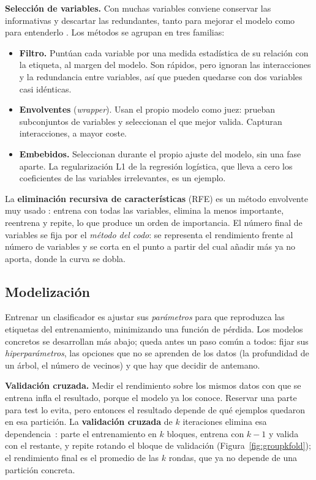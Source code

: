 \documentclass[12pt,a4paper]{report}
\theoremstyle{definition}
\begin{document}
\medskip
\noindent\textbf{Selección de variables.} Con muchas variables conviene conservar las informativas y
descartar las redundantes, tanto para mejorar el modelo como para entenderlo \cite{guyon2003selection}.
Los métodos se agrupan en tres familias:
\begin{itemize}
\item \textbf{Filtro.} Puntúan cada variable por una medida estadística de su relación con la etiqueta,
al margen del modelo. Son rápidos, pero ignoran las interacciones y la redundancia entre variables, así
que pueden quedarse con dos variables casi idénticas.
\item \textbf{Envolventes} (\emph{wrapper}). Usan el propio modelo como juez: prueban subconjuntos de
variables y seleccionan el que mejor valida. Capturan interacciones, a mayor coste.
\item \textbf{Embebidos.} Seleccionan durante el propio ajuste del modelo, sin una fase aparte. La
regularización L1 de la regresión logística, que lleva a cero los coeficientes de las variables
irrelevantes, es un ejemplo.
\end{itemize}
La \textbf{eliminación recursiva de características} (RFE) es un método envolvente muy usado
\cite{guyon2002rfe}: entrena con todas las variables, elimina la menos importante, reentrena y repite,
lo que produce un orden de importancia. El número final de variables se fija por el \emph{método del
codo}: se representa el rendimiento frente al número de variables y se corta en el punto a partir del
cual añadir más ya no aporta, donde la curva se dobla.

\subsection{Modelización}

Entrenar un clasificador es ajustar sus \emph{parámetros} para que reproduzca las etiquetas del
entrenamiento, minimizando una función de pérdida. Los modelos concretos se desarrollan más abajo;
queda antes un paso común a todos: fijar sus \emph{hiperparámetros}, las opciones que no se aprenden de
los datos (la profundidad de un árbol, el número de vecinos) y que hay que decidir de antemano.

\medskip
\noindent\textbf{Validación cruzada.} Medir el rendimiento sobre los mismos datos con que se entrena
infla el resultado, porque el modelo ya los conoce. Reservar una parte para test lo evita, pero
entonces el resultado depende de qué ejemplos quedaron en esa partición. La \textbf{validación cruzada}
de $k$ iteraciones elimina esa dependencia~\cite{stone1974crossval}: parte el entrenamiento en $k$
bloques, entrena con $k-1$ y valida con el restante, y repite rotando el bloque de validación
(Figura~\ref{fig:groupkfold}); el rendimiento final es el promedio de las $k$ rondas, que ya no depende
de una partición concreta.
\end{document}
